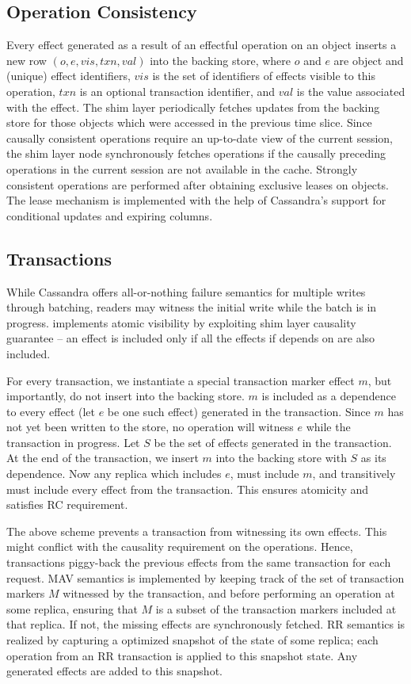 \subsection{Operation Consistency}

Every effect generated as a result of an effectful operation on an object
inserts a new row $(o,e,vis,txn,val)$ into the backing store, where $o$ and $e$
are object and (unique) effect identifiers, $vis$ is the set of identifiers of
effects visible to this operation, $txn$ is an optional transaction identifier,
and $val$ is the value associated with the effect. The shim layer periodically
fetches updates from the backing store for those objects which were accessed in
the previous time slice. Since causally consistent operations require an
up-to-date view of the current session, the shim layer node synchronously
fetches operations if the causally preceding operations in the current session
are not available in the cache. Strongly consistent operations are performed
after obtaining exclusive leases on objects. The lease mechanism is implemented
with the help of Cassandra's support for conditional updates and expiring
columns.

\subsection{Transactions}

While Cassandra offers all-or-nothing failure semantics for multiple writes
through batching, readers may witness the initial write while the batch is in
progress. \name implements atomic visibility by exploiting shim layer causality
guarantee -- an effect is included only if all the effects if depends on are
also included.

For every transaction, we instantiate a special transaction marker effect $m$,
but importantly, do not insert into the backing store. $m$ is included as a
dependence to every effect (let $e$ be one such effect) generated in the
transaction. Since $m$ has not yet been written to the store, no operation will
witness $e$ while the transaction in progress. Let $S$ be the set of effects
generated in the transaction. At the end of the transaction, we insert $m$ into
the backing store with $S$ as its dependence. Now any replica which includes
$e$, must include $m$, and transitively must include every effect from the
transaction. This ensures atomicity and satisfies RC requirement.

The above scheme prevents a transaction from witnessing its own effects. This
might conflict with the causality requirement on the operations. Hence,
transactions piggy-back the previous effects from the same transaction for each
request. MAV semantics is implemented by keeping track of the set of
transaction markers $M$ witnessed by the transaction, and before performing an
operation at some replica, ensuring that $M$ is a subset of the transaction
markers included at that replica. If not, the missing effects are synchronously
fetched. RR semantics is realized by capturing a optimized snapshot of the
state of some replica; each operation from an RR transaction is applied to this
snapshot state. Any generated effects are added to this snapshot.

